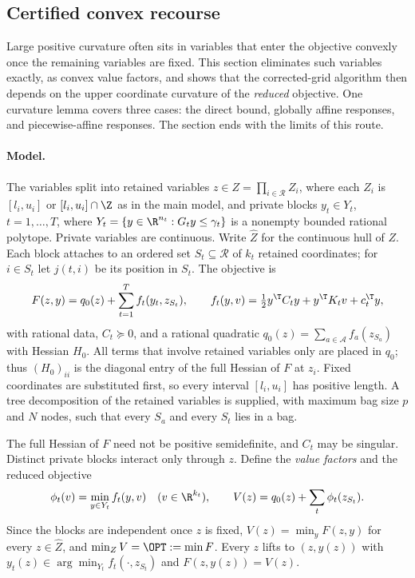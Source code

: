 \subsection{Certified convex recourse}\label{sec:convexrecourse}

Large positive curvature often sits in variables that enter the objective
convexly once the remaining variables are fixed. This section eliminates such
variables exactly, as convex value factors, and shows that the
corrected-grid algorithm then depends on the upper coordinate curvature of
the \emph{reduced} objective. One curvature lemma covers three cases: the
direct bound, globally affine responses, and piecewise-affine responses.
The section ends with the limits of this route.

\paragraph{Model.}

\begin{definition}\label{def:cv-model}
The variables split into retained variables $z\in Z=\prod_{i\in\mathcal R}Z_i$,
where each $Z_i$ is $[l_i,u_i]$ or $[l_i,u_i]\cap\Z$ as in the main model, and
private blocks $y_t\in Y_t$, $t=1,\ldots,T$, where
$Y_t=\{y\in\R^{n_t}:G_ty\le\gamma_t\}$ is a nonempty bounded rational polytope.
Private variables are continuous. Write $\widehat Z$ for the continuous hull of
$Z$. Each block attaches to an ordered set $S_t\subseteq\mathcal R$ of
$k_t$ retained coordinates; for $i\in S_t$ let $j(t,i)$ be its position in
$S_t$. The objective is
\begin{equation}\label{eq:cv-model}
F(z,y)=q_0(z)+\sum_{t=1}^T f_t(y_t,z_{S_t}),\qquad
f_t(y,v)=\tfrac12y^{\T}C_ty+y^{\T}K_tv+c_t^{\T}y,
\end{equation}
with rational data, $C_t\succeq0$, and a rational quadratic
$q_0(z)=\sum_{a\in\mathcal A}f_a(z_{S_a})$ with Hessian $H_0$. All terms that
involve retained variables only are placed in $q_0$; thus $(H_0)_{ii}$ is the
diagonal entry of the full Hessian of $F$ at $z_i$. Fixed coordinates are
substituted first, so every interval $[l_i,u_i]$ has positive length.
A tree decomposition of the retained variables is supplied, with maximum bag
size $p$ and $N$ nodes, such that every $S_a$ and every $S_t$ lies in a bag.
\end{definition}

The full Hessian of $F$ need not be positive semidefinite, and $C_t$ may be
singular. Distinct private blocks interact only through $z$. Define the
\emph{value factors} and the reduced objective
\begin{equation}\label{eq:cv-value}
\phi_t(v)=\min_{y\in Y_t}f_t(y,v)\quad(v\in\R^{k_t}),\qquad
V(z)=q_0(z)+\sum_t\phi_t(z_{S_t}).
\end{equation}
Since the blocks are independent once $z$ is fixed,
$V(z)=\min_yF(z,y)$ for every $z\in\widehat Z$, and $\min_ZV=\OPT:=\min F$.
Every $z$ lifts to $(z,y(z))$ with $y_t(z)\in\arg\min_{Y_t}f_t(\cdot,z_{S_t})$
and $F(z,y(z))=V(z)$.


